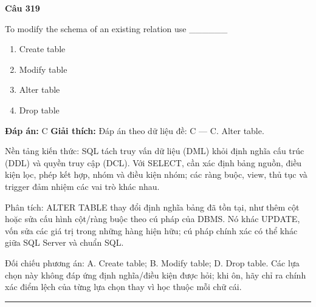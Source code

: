 \documentclass[11pt,a4paper]{article}
\newenvironment{question}[1]{%
  \par\vspace{1em}\noindent\textbf{\large Câu #1}\par\vspace{0.4em}
}{%
  \par\vspace{1em}\hrule\vspace{0.6em}
}
\newenvironment{choices}{%
  \begin{enumerate}[label=\textbf{\Alph*.},leftmargin=2.2em,itemsep=2pt,topsep=3pt]
}{%
  \end{enumerate}
}
\newcommand{\choice}{\item}
\begin{document}
\begin{question}{319}
To modify the schema of an existing relation use ______
\begin{choices}
\choice Create table
\choice Modify table
\choice Alter table
\choice Drop table
\end{choices}
\textbf{Đáp án:} C
\textbf{Giải thích:} Đáp án theo dữ liệu đề: C — C. Alter table.

Nền tảng kiến thức: SQL tách truy vấn dữ liệu (DML) khỏi định nghĩa cấu trúc (DDL) và quyền truy cập (DCL). Với SELECT, cần xác định bảng nguồn, điều kiện lọc, phép kết hợp, nhóm và điều kiện nhóm; các ràng buộc, view, thủ tục và trigger đảm nhiệm các vai trò khác nhau.

Phân tích: ALTER TABLE thay đổi định nghĩa bảng đã tồn tại, như thêm cột hoặc sửa cấu hình cột/ràng buộc theo cú pháp của DBMS. Nó khác UPDATE, vốn sửa các giá trị trong những hàng hiện hữu; cú pháp chính xác có thể khác giữa SQL Server và chuẩn SQL.

Đối chiếu phương án: A. Create table; B. Modify table; D. Drop table. Các lựa chọn này không đáp ứng định nghĩa/điều kiện được hỏi; khi ôn, hãy chỉ ra chính xác điểm lệch của từng lựa chọn thay vì học thuộc mỗi chữ cái.
\end{question}
\end{document}
